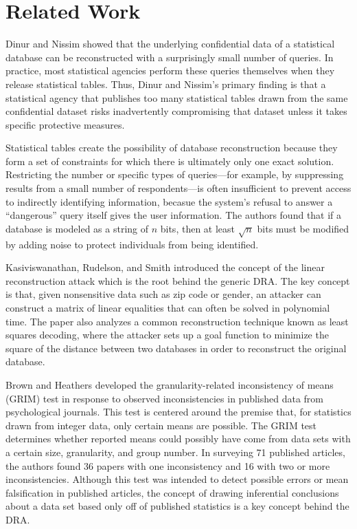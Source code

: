 \documentclass[runningheads]{llncs}
\begin{document}
\section{Related Work}

Dinur and Nissim\cite{noise} showed that the underlying
confidential data of a statistical database can be reconstructed with
a surprisingly small number of queries. In practice, most statistical
agencies perform these queries themselves when they release
statistical tables. Thus, Dinur and Nissim's primary finding
is that a statistical agency that publishes too many statistical
tables drawn from the same confidential dataset risks inadvertently
compromising that dataset unless it takes specific protective measures.

Statistical tables create the possibility of database reconstruction
because they form a set of constraints for which there is ultimately
only one exact solution. Restricting
the number or specific types of queries---for example, by suppressing
results from a small number of respondents---is often insufficient to prevent access
to indirectly identifying information, becasue the system's refusal to
answer a ``dangerous'' query itself gives the user information. The
authors found that if a database is modeled as a string of $n$ bits,
then at least $\sqrt{n}$ bits must be modified by adding noise to
protect individuals from being identified.


Kasiviswanathan, Rudelson, and Smith\cite{Kasiviswanathan:2013:PLR:2627817.2627919} introduced
the concept of the linear reconstruction attack which is the root
behind the generic DRA. The key concept is that,
given nonsensitive data such as zip code or gender, an attacker
can construct a matrix of linear equalities that can often be solved
in polynomial time. The paper also analyzes a common reconstruction
technique known as least squares decoding, where the attacker sets up
a goal function to minimize the square of the distance between two
databases in order to reconstruct the original database.

Brown and Heathers\cite{doi:10.1177/1948550616673876} developed the
granularity-related inconsistency of means (GRIM) test in response to
observed inconsistencies in published data from psychological
journals. This test is centered around the premise that, for
statistics drawn from integer data, only certain means are
possible. The GRIM test determines whether reported means could
possibly have come from data sets with a certain size, granularity,
and group number. In surveying 71 published articles, the authors
found 36 papers with one inconsistency and 16 with two or more
inconsistencies. Although this test was intended to detect possible
errors or mean falsification in published articles, the concept of
drawing inferential conclusions about a data set based only off of
published statistics is a key concept behind the DRA.
\end{document}
